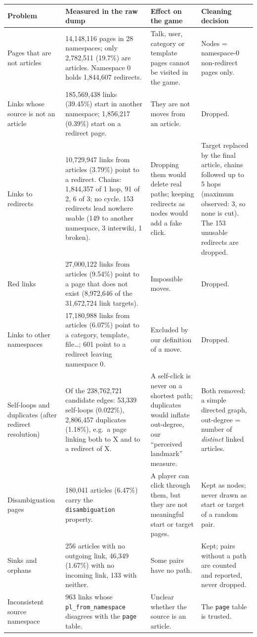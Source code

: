 \documentclass[10pt,a4paper]{article}
\begin{document}
\medskip
\small
\begin{tabularx}{\textwidth}{@{}>{\raggedright\arraybackslash}p{2.6cm}LLL@{}}
\toprule
\textbf{Problem} & \textbf{Measured in the raw dump} & \textbf{Effect on the game} & \textbf{Cleaning decision} \\
\midrule
Pages that are not articles &
14,148,116 pages in 28 namespaces; only 2,782,511 (19.7\%) are articles. Namespace 0 holds 1,844,607 redirects. &
Talk, user, category or template pages cannot be visited in the game. &
Nodes = namespace-0 non-redirect pages only. \\
\addlinespace
Links whose source is not an article &
185,569,438 links (39.45\%) start in another namespace; 1,856,217 (0.39\%) start on a redirect page. &
They are not moves from an article. &
Dropped. \\
\addlinespace
Links to redirects &
10,729,947 links from articles (3.79\%) point to a redirect. Chains: 1,844,357 of 1 hop, 91 of 2, 6 of 3; no cycle. 153 redirects lead nowhere usable (149 to another namespace, 3 interwiki, 1 broken). &
Dropping them would delete real paths; keeping redirects as nodes would add a fake click. &
Target replaced by the final article, chains followed up to 5 hops (maximum observed: 3, so none is cut). The 153 unusable redirects are dropped. \\
\addlinespace
Red links &
27,000,122 links from articles (9.54\%) point to a page that does not exist (8,972,646 of the 31,672,724 link targets). &
Impossible moves. &
Dropped. \\
\addlinespace
Links to other namespaces &
17,180,988 links from articles (6.07\%) point to a category, template, file\ldots; 601 point to a redirect leaving namespace 0. &
Excluded by our definition of a move. &
Dropped. \\
\addlinespace
Self-loops and duplicates (after redirect resolution) &
Of the 238,762,721 candidate edges: 53,339 self-loops (0.022\%), 2,806,457 duplicates (1.18\%), e.g.\ a page linking both to X and to a redirect of X. &
A self-click is never on a shortest path; duplicates would inflate out-degree, our ``perceived landmark'' measure. &
Both removed: a simple directed graph, out-degree = number of \emph{distinct} linked articles. \\
\addlinespace
Disambiguation pages &
180,041 articles (6.47\%) carry the \texttt{disambiguation} property. &
A player can click through them, but they are not meaningful start or target pages. &
Kept as nodes; never drawn as start or target of a random pair. \\
\addlinespace
Sinks and orphans &
256 articles with no outgoing link, 46,349 (1.67\%) with no incoming link, 133 with neither. &
Some pairs have no path. &
Kept; pairs without a path are counted and reported, never dropped. \\
\addlinespace
Inconsistent source namespace &
963 links whose \texttt{pl\_from\_namespace} disagrees with the \texttt{page} table. &
Unclear whether the source is an article. &
The \texttt{page} table is trusted. \\
\bottomrule
\end{tabularx}
\end{document}
